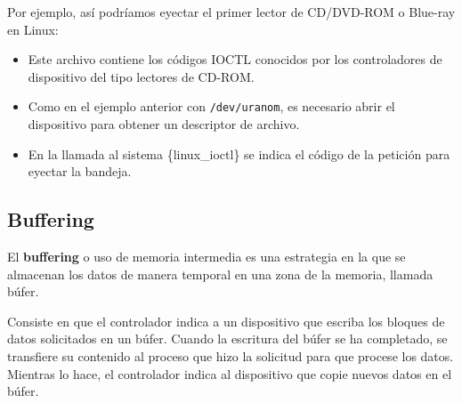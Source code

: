Por ejemplo, así podríamos eyectar el primer lector de CD/DVD-ROM o
Blue-ray en Linux:

\begin{Shaded}
\begin{Highlighting}[]
\PreprocessorTok{                              }


\OperatorTok{=}\OperatorTok{(} \OperatorTok{,}\OperatorTok{|}\OperatorTok{);}
 \OperatorTok{(}\OperatorTok{\textgreater{}=} \OperatorTok{)} \OperatorTok{\{}
\OperatorTok{(}\OperatorTok{,}\OperatorTok{);}
\OperatorTok{(}\OperatorTok{);}
\OperatorTok{\}}
\end{Highlighting}
\end{Shaded}

\begin{itemize}
\item
  Este archivo contiene los códigos IOCTL conocidos por los
  controladores de dispositivo del tipo lectores de CD-ROM.
\item
  Como en el ejemplo anterior con \texttt{/dev/uranom}, es necesario
  abrir el dispositivo para obtener un descriptor de archivo.
\item
  En la llamada al sistema \{linux\_ioctl\} se indica el código de la
  petición para eyectar la bandeja.
\end{itemize}

\subsection{\texorpdfstring{{}Buffering}{Buffering}}\label{_bufferingbuffering}

El \textbf{buffering} o uso de memoria intermedia es una estrategia en
la que se almacenan los datos de manera temporal en una zona de la
memoria, llamada búfer.

Consiste en que el controlador indica a un dispositivo que escriba los
bloques de datos solicitados en un búfer. Cuando la escritura del búfer
se ha completado, se transfiere su contenido al proceso que hizo la
solicitud para que procese los datos. Mientras lo hace, el controlador
indica al dispositivo que copie nuevos datos en el búfer.

